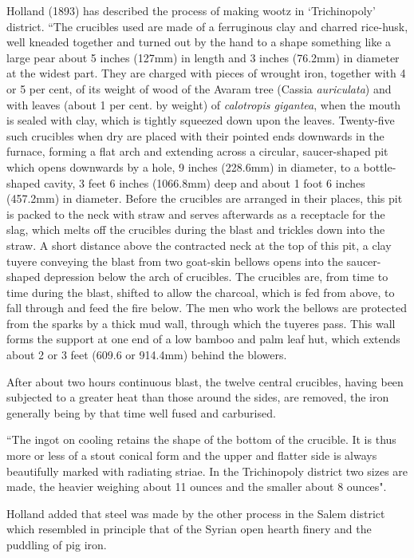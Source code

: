 Holland (1893) has described the process of making wootz in ‘Trichinopoly’ district. “The crucibles used are made of a ferruginous clay and charred rice-husk, well kneaded together and turned out by the hand to a shape something like a large pear about 5 inches (127mm) in length and 3 inches (76.2mm) in diameter at the widest part. They are charged with pieces of wrought iron, together with 4 or 5 per cent, of its weight of wood of the Avaram tree (Cassia {\it auriculata}) and with leaves (about 1 per cent. by weight) of {\it calotropis gigantea}, when the mouth is sealed with clay, which is tightly squeezed down upon the leaves. Twenty-five such crucibles when dry are placed with their pointed ends downwards in the furnace, forming a flat arch and extending across a circular, saucer-shaped pit which opens downwards by a hole, 9 inches (228.6mm) in diameter, to a bottle- shaped cavity, 3 feet 6 inches (1066.8mm) deep and about 1 foot 6 inches (457.2mm) in diameter. Before the crucibles are arranged in their places, this pit is packed to the neck with straw and serves afterwards as a receptacle for the slag, which melts off the crucibles during the blast and trickles down into the straw. A short distance above the contracted neck at the top of this pit, a clay tuyere conveying the blast from two goat-skin bellows opens into the saucer-shaped depression below the arch of crucibles. The crucibles are, from time to time during the blast, shifted to allow the charcoal, which is fed from above, to fall through and feed the fire below. The men who work the bellows are protected from the sparks by a thick mud wall, through which the tuyeres pass. This wall forms the support at one end of a low bamboo and palm leaf hut, which extends about 2 or 3 feet (609.6 or 914.4mm) behind the blowers.

After about two hours continuous blast, the twelve central crucibles, having been subjected to a greater heat than those around the sides, are removed, the iron generally being by that time well fused and carburised. 

\footnotesize{``The ingot on cooling retains the shape of the bottom of the crucible. It is thus more or less of a stout conical form and the upper and flatter side is always beautifully marked with radiating striae. In the Trichinopoly district two sizes are made, the heavier weighing about 11 ounces and the smaller about 8 ounces".}

Holland added that steel was made by the other process in the Salem district which resembled in principle that of the Syrian open hearth finery and the puddling of pig iron. 

